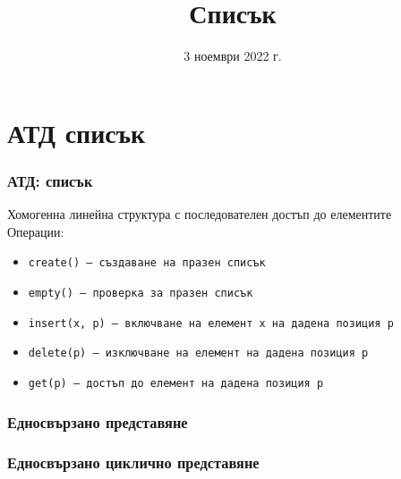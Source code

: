 \documentclass[alsotrans]{beamerswitch}
\title{Списък}
\date{3 ноември 2022 г.}
\newcommand{\linkedchain}{
  \doublecell{a1}{a_1}
  \nextdoublecell{a2}{a_2}{a1}
  \nextdots{a2}
  \dotsnextdoublecell{an-1}{a_{n-1}}
  \nextdoublecell{an}{a_n}{an-1}
}
\begin{document}
\begin{frame}
  \titlepage
\end{frame}

\section{АТД списък}

\begin{frame}
  \frametitle{АТД: списък}

  Хомогенна линейна структура с последователен достъп до елементите\\[2ex]
  Операции:\\[1ex]
  \begin{itemize}
  \item \tt{create()} --- създаване на празен списък
  \item \tt{empty()} --- проверка за празен списък
  \item \tt{insert(x, p)} --- включване на елемент \tt x на дадена позиция \tt p
  \item \tt{delete(p)} --- изключване на елемент на дадена позиция \tt p
  \item \tt{get(p)} --- достъп до елемент на дадена позиция \tt p
  \end{itemize}
\end{frame}

\begin{frame}
  \frametitle{Едносвързано представяне}

  \begin{center}
  \end{center}
\end{frame}

\begin{frame}
  \frametitle{Едносвързано циклично представяне}

  \begin{center}
    \small
  \end{center}
\end{frame}
\end{document}
